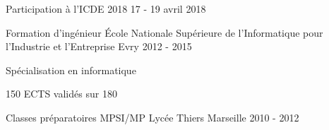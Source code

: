 
\begin{cventries}


\cventry
{}
{Participation à l'ICDE 2018}
{}
{17 - 19 avril 2018}
{}

\cventry
{Formation d'ingénieur}
{\'Ecole Nationale Supérieure de l'Informatique pour l'Industrie et l'Entreprise}
{Evry}
{2012 - 2015}
{
	\begin{cvitems}
	\item{Spécialisation en informatique}
	\item{150 ECTS validés sur 180}
	\end{cvitems}
}

\cventry
{Classes préparatoires MPSI/MP}
{Lycée Thiers}
{Marseille}
{2010 - 2012}
{}

\end{cventries}